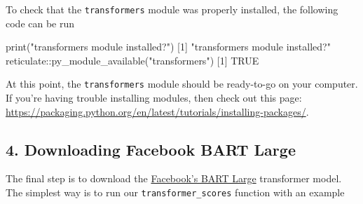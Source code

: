 \documentclass[
]{article}
\newenvironment{Shaded}{\begin{snugshade}}{\end{snugshade}}
\newcommand{\AttributeTok}[1]{\textcolor[rgb]{0.77,0.63,0.00}{#1}}
\newcommand{\CommentTok}[1]{\textcolor[rgb]{0.56,0.35,0.01}{\textit{#1}}}
\newcommand{\ConstantTok}[1]{\textcolor[rgb]{0.00,0.00,0.00}{#1}}
\newcommand{\DecValTok}[1]{\textcolor[rgb]{0.00,0.00,0.81}{#1}}
\newcommand{\FunctionTok}[1]{\textcolor[rgb]{0.00,0.00,0.00}{#1}}
\newcommand{\NormalTok}[1]{#1}
\newcommand{\SpecialCharTok}[1]{\textcolor[rgb]{0.00,0.00,0.00}{#1}}
\newcommand{\StringTok}[1]{\textcolor[rgb]{0.31,0.60,0.02}{#1}}
\begin{document}
To check that the \texttt{transformers} module was properly installed,
the following code can be run

\begin{Shaded}
\begin{Highlighting}[]
\FunctionTok{print}\NormalTok{(}\StringTok{"\textquotesingle{}transformers\textquotesingle{} module installed?"}\NormalTok{)}
\NormalTok{[}\DecValTok{1}\NormalTok{] }\StringTok{"\textquotesingle{}transformers\textquotesingle{} module installed?"}
\NormalTok{reticulate}\SpecialCharTok{::}\FunctionTok{py\_module\_available}\NormalTok{(}\StringTok{"transformers"}\NormalTok{)}
\NormalTok{[}\DecValTok{1}\NormalTok{] }\ConstantTok{TRUE}
\end{Highlighting}
\end{Shaded}

At this point, the \texttt{transformers} module should be ready-to-go on
your computer. If you're having trouble installing modules, then check
out this page:
\url{https://packaging.python.org/en/latest/tutorials/installing-packages/}.

\hypertarget{downloading-facebook-bart-large}{%
\subsection{4. Downloading Facebook BART
Large}\label{downloading-facebook-bart-large}}

The final step is to download the
\href{https://huggingface.co/facebook/bart-large-mnli}{Facebook's BART Large}
transformer model. The simplest way is to run our
\texttt{transformer\_scores} function with an example

\begin{Shaded}
\end{Shaded}
\end{document}
